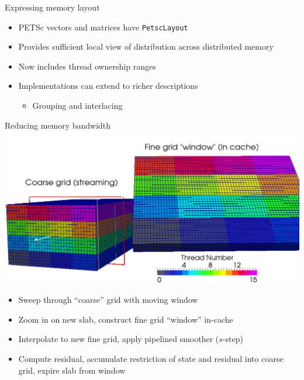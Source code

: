 \documentclass{beamer}
\begin{document}
\begin{frame}{Expressing memory layout}
  \begin{itemize}
  \item PETSc vectors and matrices have \texttt{PetscLayout}
  \item Provides sufficient local view of distribution across distributed memory
  \item Now includes thread ownership ranges
  \item Implementations can extend to richer descriptions
    \begin{itemize}
    \item Grouping and interlacing
    \end{itemize}
  \end{itemize}
\end{frame}




\begin{frame}{Reducing memory bandwidth}
  \includegraphics[width=\textwidth]{figures/MG/SRMGWindow}
  \begin{itemize}
  \item Sweep through ``coarse'' grid with moving window
  \item Zoom in on new slab, construct fine grid ``window'' in-cache
  \item Interpolate to new fine grid, apply pipelined smoother ($s$-step)
  \item Compute residual, accumulate restriction of state and residual into coarse grid, expire slab from window
  \end{itemize}
\end{frame}
\end{document}
